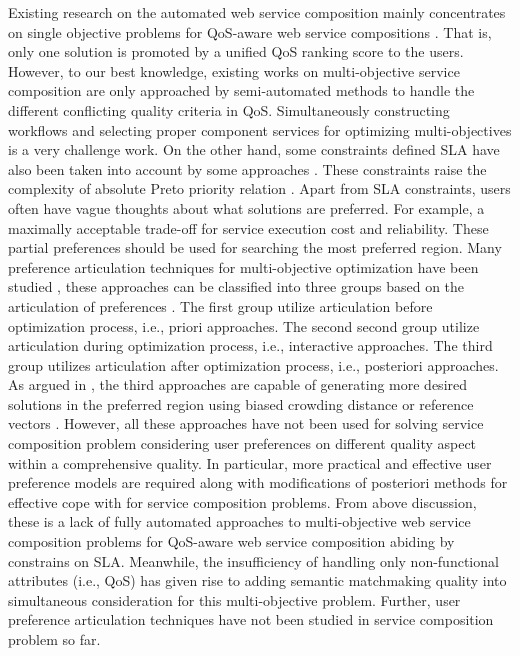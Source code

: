 Existing research on the automated web service composition mainly concentrates on single objective problems for QoS-aware web service compositions \cite{canfora2005approach,da2015graphevol,da2015gp,lecue2009optimizing,liu2007hybrid,long2009environment,ma2015hybrid,pop2009immune,rodriguez2010composition,tang2010hybrid,yu2013adaptive}. That is, only one solution is promoted by a unified QoS ranking score to the users. However, to our best knowledge, existing works on multi-objective service composition \cite{liu2005dynamic,wada2012e3,yao2009qos,yin2014hybrid} are only approached by semi-automated methods to handle the different conflicting quality criteria in QoS. Simultaneously constructing workflows and selecting proper component services for optimizing multi-objectives is a very challenge work. On the other hand, some constraints defined SLA have also been taken into account by some approaches \cite{wada2012e3,yin2014hybrid}. These constraints raise the complexity of absolute Preto priority relation \cite{garey1979guide}. Apart from SLA constraints, users often have vague thoughts about what solutions are preferred. For example, a maximally acceptable trade-off for service execution cost and reliability. These partial preferences should be used for searching the most preferred region. Many preference articulation techniques for multi-objective optimization have been studied \cite{branke2016using,branke2005integrating,branke2001guidance,cheng2015reference,giagkiozis2014pareto}, these approaches can be classified into three groups based on the articulation of preferences \cite{van2000multiobjective}. The first group utilize articulation before optimization process, i.e., priori approaches. The second second group utilize articulation during optimization process, i.e., interactive approaches. The third group utilizes articulation after optimization process, i.e., posteriori approaches. As argued in \cite{giagkiozis2014pareto}, the third approaches are capable of generating more desired solutions in the preferred region using biased crowding distance \cite{branke2005integrating} or reference vectors \cite{cheng2015reference}. However, all these approaches have not been used for solving service composition problem considering user preferences on different quality aspect within a comprehensive quality. In particular, more practical and effective user preference models are required along with modifications of posteriori methods for effective cope with for service composition problems. From above discussion, these is a lack of fully automated approaches to multi-objective web service composition problems for QoS-aware web service composition abiding by constrains on SLA. Meanwhile, the insufficiency of handling only non-functional attributes (i.e., QoS) has given rise to adding semantic matchmaking quality into simultaneous consideration for this multi-objective problem. Further, user preference articulation techniques have not been studied in service composition problem so far.

